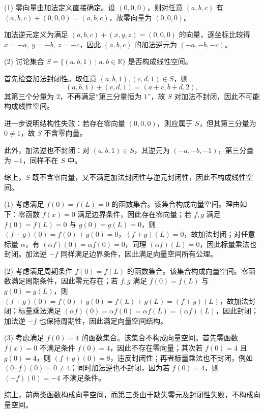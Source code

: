 \begin{solution}[三元组空间的结构分析]

\answer
(1) 零向量由加法定义直接确定。设 $(0,0,0)$，则对任意 $(a,b,c)$ 有
$(a,b,c)+(0,0,0)=(a,b,c)$，故零向量为 $(0,0,0)$。

加法逆元定义为满足 $(a,b,c)+(x,y,z)=(0,0,0)$ 的向量，逐坐标比较得
$x=-a,\ y=-b,\ z=-c$，因此
$(a,b,c)$ 的加法逆元为 $(-a,-b,-c)$。

(2) 讨论集合 $S=\{(a,b,1)\mid a,b\in\mathbb{R}\}$ 是否构成线性空间。

首先检查加法封闭性。取任意 $(a,b,1),(c,d,1)\in S$，则
\[
(a,b,1)+(c,d,1)=(a+c,b+d,2),
\]
其第三个分量为 $2$，不再满足“第三分量恒为 $1$”，故 $S$ 对加法不封闭，因此不可能构成线性空间。

进一步说明结构性失败：若存在零向量 $(0,0,0)$，则应属于 $S$，但其第三分量为 $0\neq 1$，故 $S$ 不含零向量。

此外，加法逆也不封闭：对 $(a,b,1)\in S$，其逆元为 $(-a,-b,-1)$，第三分量为 $-1$，同样不在 $S$ 中。

综上，$S$ 既不含零向量，又不满足加法封闭性与逆元封闭性，因此不构成线性空间。
\end{solution}


\begin{solution}[函数作为向量]

\answer
(1) 考虑满足 $f(0)=f(L)=0$ 的函数集合。该集合构成向量空间。理由如下：零函数 $f(x)=0$ 满足边界条件，因此存在零向量；若 $f,g$ 满足 $f(0)=f(L)=0$ 与 $g(0)=g(L)=0$，则
$(f+g)(0)=f(0)+g(0)=0$，$(f+g)(L)=0$，故加法封闭；对任意标量 $\alpha$，有
$(\alpha f)(0)=\alpha f(0)=0$，同理 $(\alpha f)(L)=0$，因此标量乘法也封闭。加法逆 $-f$ 同样满足边界条件，因此满足向量空间所有公理。

(2) 考虑满足周期条件 $f(0)=f(L)$ 的函数集合。该集合构成向量空间。零函数满足周期条件，因此零元存在；若 $f,g$ 满足 $f(0)=f(L)$ 与 $g(0)=g(L)$，则
$(f+g)(0)=f(0)+g(0)=f(L)+g(L)=(f+g)(L)$，故加法封闭；标量乘法满足
$(\alpha f)(0)=\alpha f(0)=\alpha f(L)=(\alpha f)(L)$，因此封闭；加法逆 $-f$ 也保持周期性，因此满足向量空间结构。

(3) 考虑满足 $f(0)=4$ 的函数集合。该集合不构成向量空间。首先零函数 $f(x)=0$ 不满足条件 $f(0)=4$，因此不存在零向量；其次若 $f(0)=4$ 且 $g(0)=4$，则
$(f+g)(0)=8$，违反封闭性；再者标量乘法也不封闭，例如 $(0\cdot f)(0)=0 \neq 4$；同时加法逆也不封闭，因为若 $f(0)=4$，则 $(-f)(0)=-4$ 不满足条件。

综上，前两类函数构成向量空间，而第三类由于缺失零元及封闭性失败，不构成向量空间。
\end{solution}


